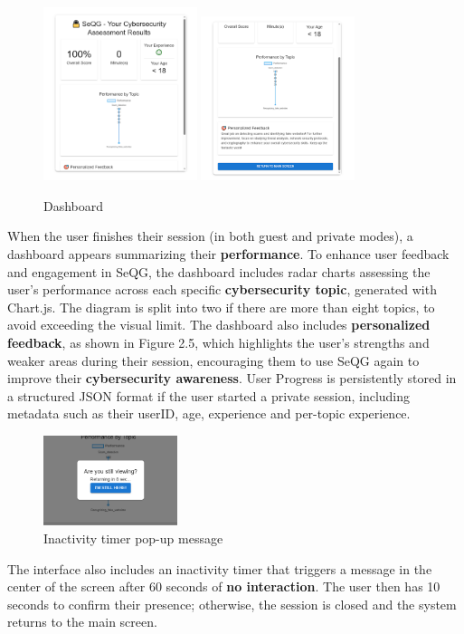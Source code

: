 \begin{figure}[H]
    \centering
    \includegraphics[width=0.4\textwidth]{images/Grading2.png}
    \includegraphics[width=0.4\textwidth]{images/Grading3.png}
    \caption{Dashboard}
\end{figure}
When the user finishes their session (in both guest and private modes), a dashboard appears summarizing their \textbf{performance}. 
To enhance user feedback and engagement in SeQG, the dashboard includes radar charts assessing the user's performance 
across each specific \textbf{cybersecurity topic}, generated with Chart.js. The diagram is split into two if there are more 
than eight topics, to avoid exceeding the visual limit. The dashboard also includes \textbf{personalized feedback}, as 
shown in Figure 2.5, which highlights the user's strengths and weaker areas during their session, encouraging 
them to use SeQG again to improve their \textbf{cybersecurity awareness}. User Progress is persistently stored in a 
structured JSON format if the user started a private session, including metadata such as their userID, age, 
experience and per-topic experience.


\begin{figure}[H]
    \centering
    \includegraphics[width=0.35\textwidth]{images/Grading1.png}
    \caption{Inactivity timer pop-up message}
\end{figure}
The interface also includes an inactivity timer that triggers a message in the center of the screen after 60 seconds 
of \textbf{no interaction}. The user then has 10 seconds to confirm their presence; otherwise, the session is closed and the 
system returns to the main screen.